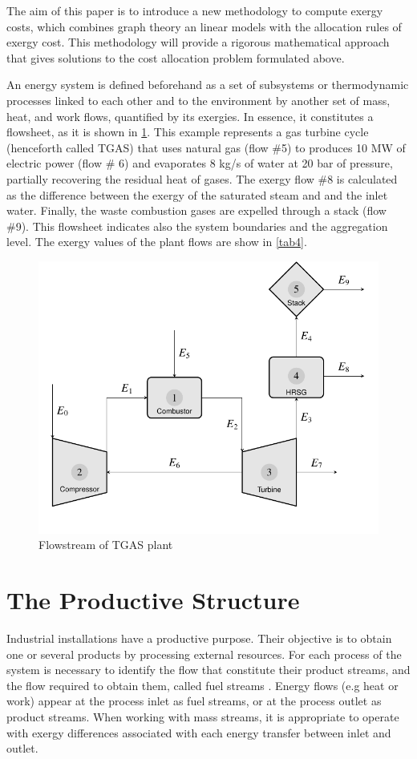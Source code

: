 \documentclass[preprint,12pt,times]{elsarticle}
\begin{document}
The aim of this paper is to introduce a new methodology to compute exergy costs, which combines graph theory an linear models with the allocation rules of exergy cost. This methodology will provide a rigorous mathematical approach that gives solutions to the cost allocation problem formulated above.

An energy system is defined beforehand as a set of subsystems or thermodynamic processes linked to each other and to the environment by another set of mass, heat, and work flows, quantified by its exergies. In essence, it constitutes a flowsheet, as it is shown in \cref{fig1}. This example represents a gas turbine cycle (henceforth called TGAS) that uses natural gas (flow \#5) to produces 10 MW of electric power (flow \# 6) and evaporates 8 kg/s of water at 20 bar of pressure, partially recovering the residual heat of gases. The exergy flow \#8 is calculated as the difference between the exergy of the saturated steam and and the inlet water. Finally, the waste combustion gases are expelled through a stack (flow \#9). This flowsheet indicates also the system boundaries and the aggregation level. The exergy values of the plant flows are show in \cref{tab4}.  

\begin{figure}[h]
	\centering
	\includegraphics[width=0.65\linewidth]{tgas.pdf}
	\caption{Flowstream of TGAS plant}
	\label{fig1}
\end{figure}
\section{The Productive Structure}
\label{S:2}
Industrial installations have a productive purpose. Their objective is to obtain one or several products by processing external resources. For each process of the system is necessary to identify the flow that constitute their product streams, and the flow  required to obtain them, called fuel streams \cite{Tsatsaronis1985,SPECO06}. Energy flows (e.g heat or work) appear at the process inlet as fuel streams, or at the process outlet as product streams. When working with mass streams, it is appropriate to operate with exergy differences associated with each energy transfer between inlet and outlet.
\end{document}
